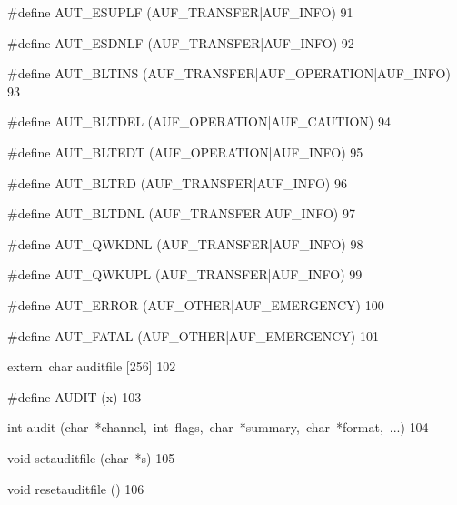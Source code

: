 \documentclass{article}
\begin{document}
\begin{cxxmacro}
{\#define}
        {AUT\_ESUPLF}
        {(AUF\_TRANSFER|AUF\_INFO)}
        {}
        {91}
\end{cxxmacro}
\begin{cxxmacro}
{\#define}
        {AUT\_ESDNLF}
        {(AUF\_TRANSFER|AUF\_INFO)}
        {}
        {92}
\end{cxxmacro}
\begin{cxxmacro}
{\#define}
        {AUT\_BLTINS}
        {(AUF\_TRANSFER|AUF\_OPERATION|AUF\_INFO)}
        {}
        {93}
\end{cxxmacro}
\begin{cxxmacro}
{\#define}
        {AUT\_BLTDEL}
        {(AUF\_OPERATION|AUF\_CAUTION)}
        {}
        {94}
\end{cxxmacro}
\begin{cxxmacro}
{\#define}
        {AUT\_BLTEDT}
        {(AUF\_OPERATION|AUF\_INFO)}
        {}
        {95}
\end{cxxmacro}
\begin{cxxmacro}
{\#define}
        {AUT\_BLTRD}
        {(AUF\_TRANSFER|AUF\_INFO)}
        {}
        {96}
\end{cxxmacro}
\begin{cxxmacro}
{\#define}
        {AUT\_BLTDNL}
        {(AUF\_TRANSFER|AUF\_INFO)}
        {}
        {97}
\end{cxxmacro}
\begin{cxxmacro}
{\#define}
        {AUT\_QWKDNL}
        {(AUF\_TRANSFER|AUF\_INFO)}
        {}
        {98}
\end{cxxmacro}
\begin{cxxmacro}
{\#define}
        {AUT\_QWKUPL}
        {(AUF\_TRANSFER|AUF\_INFO)}
        {}
        {99}
\end{cxxmacro}
\begin{cxxmacro}
{\#define}
        {AUT\_ERROR}
        {(AUF\_OTHER|AUF\_EMERGENCY)}
        {}
        {100}
\end{cxxmacro}
\begin{cxxmacro}
{\#define}
        {AUT\_FATAL}
        {(AUF\_OTHER|AUF\_EMERGENCY)}
        {}
        {101}
\end{cxxmacro}
\begin{cxxvariable}
{extern\ char}
        {auditfile}
        {[256]}
        {}
        {102}
\end{cxxvariable}
\begin{cxxmacro}
{\#define}
        {AUDIT}
        {(x)}
        {}
        {103}
\end{cxxmacro}
\begin{cxxfunction}
{int}
        {audit}
        {(char\ *channel,\ int\ flags,\ char\ *summary,\ char\ *format,\ ...)}
        {}
        {104}
\end{cxxfunction}
\begin{cxxfunction}
{void}
        {setauditfile}
        {(char\ *s)}
        {}
        {105}
\end{cxxfunction}
\begin{cxxfunction}
{void}
        {resetauditfile}
        {()}
        {}
        {106}
\end{cxxfunction}
\end{document}
